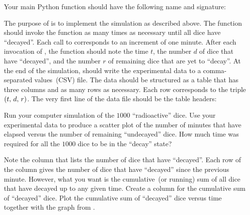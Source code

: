 \documentclass[a4paper,oneside,12pt]{article}
\begin{document}
\begin{problem}
\begin{packedenum}
  \item\label{subprob:exponential:radioactive_dice_simulation_main}
    Your main Python function should have the following name and
    signature:
    \begin{center}
    \end{center}
    The purpose of  is to implement the simulation as
    described above.  The function  should invoke the
    function  as many times as necessary until all
    dice have ``decayed''.  Each call to 
    corresponds to an increment of one minute.  After each invocation
    of , the function  should note the
    time $t$, the number $d$ of dice that have ``decayed'', and the
    number $r$ of remaining dice that are yet to ``decay''.  At the
    end of the simulation,  should write the experimental
    data to a comma-separated values~(CSV) file.  The data should be
    structured as a table that has three columns and as many rows as
    necessary.  Each row corresponds to the triple
    $({t},\, {d},\, {r})$.  The very first line of the data file should
    be the table headers:
    \begin{center}
    \end{center}

  \item\label{subprob:exponential:radioactive_dice_graph_remaining}
    Run your computer simulation of the $1000$ ``radioactive'' dice.
    Use your experimental data to produce a scatter plot of the number
    of minutes that have elapsed versus the number of remaining
    ``undecayed'' dice.  How much time was required for all the $1000$
    dice to be in the ``decay'' state?

  \item\label{subprob:exponential:radioactive_dice_cumulative_decayed}
    Note the column that lists the number of dice that have
    ``decayed''.   Each row of the column gives the number of dice
    that have ``decayed'' since the previous minute.  However, what
    you want is the cumulative~(or running) sum of all dice that have
    decayed up to any given time.  Create a column for the cumulative
    sum of ``decayed'' dice.  Plot the cumulative sum of ``decayed''
    dice versus time together with the graph
    from .


\end{packedenum}
\end{problem}
\end{document}
